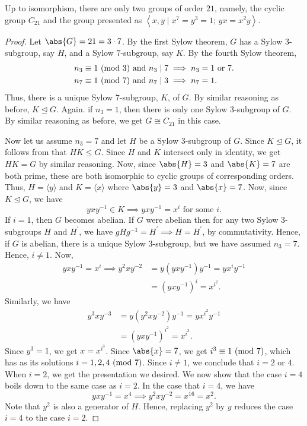 \begin{theorem} \label{thm:class-21}
    Up to isomorphism, there are only two groups of order $21$, namely, the cyclic group $C_{21}$ and the group presented as $\left\langle x,y \mid x^7 = y^3 = 1; \, yx = x^2y \right\rangle$. 
\end{theorem}
\begin{proof}
    Let $\abs{G} = 21 = 3 \cdot 7$. By the first Sylow theorem, $G$ has a Sylow $3$-subgroup, say $H$, and a Sylow $7$-subgroup, say $K$. By the fourth Sylow theorem,
    \begin{align*}
        n_3 &\equiv 1 \ (\mathrm{mod}\ 3) \text{ and } n_3 \mid 7 \implies n_3 = 1 \text{ or } 7. \\
        n_7 &\equiv 1 \ (\mathrm{mod}\ 7) \text{ and } n_7 \mid 3 \implies n_7 = 1.
    \end{align*}
    Thus, there is a unique Sylow $7$-subgroup, $K$, of $G$. By similar reasoning as before, $K \trianglelefteq G$. Again. if $n_3 = 1$, then there is only one Sylow $3$-subgroup of $G$. By similar reasoning as before, we get $G \cong C_{21}$ in this case. 
    
    Now let us assume $n_3 = 7$ and let $H$ be a Sylow $3$-subgroup of $G$. Since $K \trianglelefteq G$, it follows from  that $HK \leq G$. Since $H$ and $K$ intersect only in identity, we get $HK = G$ by similar reasoning. Now, since $\abs{H} = 3$ and $\abs{K} = 7$ are both prime, these are both isomorphic to cyclic groups of corresponding orders. Thus, $H = \langle y \rangle$ and $K = \langle x \rangle$ where $\abs{y} = 3$ and $\abs{x} = 7$. Now, since $K \trianglelefteq G$, we have
    \[
        yxy^{-1} \in K \implies yxy^{-1} = x^i \text{ for some }i.
    \]
    If $i = 1$, then $G$ becomes abelian. If $G$ were abelian then for any two Sylow $3$-subgroups $H$ and $H^{\prime}$, we have $gHg^{-1} = H^{\prime} \implies H = H^{\prime}$, by commutativity. Hence, if $G$ is abelian, there is a unique Sylow $3$-subgroup, but we have assumed $n_3 = 7$. Hence, $i \neq 1$. Now, 
    \begin{align*}
        yxy^{-1} = x^i \implies y^2xy^{-2} &= y(yxy^{-1})y^{-1} = yx^iy^{-1} \\
        &= (yxy^{-1})^i = x^{i^2}.
    \end{align*}
    Similarly, we have
    \begin{align*}
        y^3xy^{-3} &= y(y^2xy^{-2})y^{-1} = yx^{i^2}y^{-1} \\
        &= (yxy^{-1})^{i^2} = x^{i^3}.
    \end{align*}
    Since $y^3 = 1$, we get $x = x^{i^3}$. Since $\abs{x} = 7$, we get $i^3 \equiv 1\ (\mathrm{mod}\ 7)$, which has as its solutions $i = 1,2,4 \ (\mathrm{mod}\ 7)$. Since $i \neq 1$, we conclude that $i = 2$ or $4$. When $i=2$, we get the presentation we desired. We now show that the case $i=4$ boils down to the same case as $i=2$. In the case that $i=4$, we have
    \[
        yxy^{-1} = x^4 \implies y^2xy^{-2} = x^{16} = x^2.
    \]
    Note that $y^2$ is also a generator of $H$. Hence, replacing $y^2$ by $y$ reduces the case $i=4$ to the case $i=2$. 
    

\end{proof}
